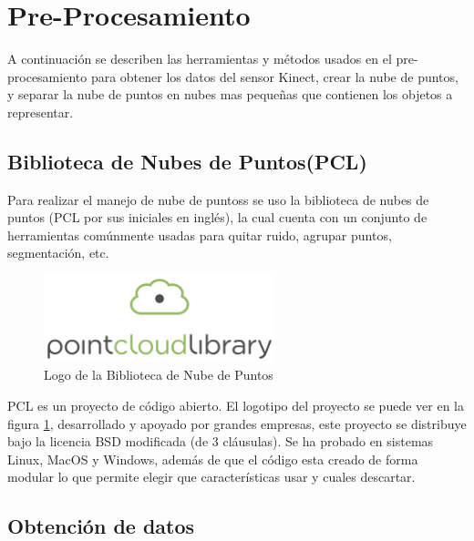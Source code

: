 \section{Pre-Procesamiento}

    A continuación se describen las herramientas y métodos usados en el pre-procesamiento para obtener los datos del sensor Kinect, crear la nube de puntos,  y separar la nube de puntos en nubes mas pequeñas que contienen los objetos a representar.
   
    
    \subsection{Biblioteca de Nubes de Puntos(PCL)}
    
    	
        Para realizar el manejo de \glspl{nube de puntos} se uso la biblioteca de nubes de puntos (PCL por sus iniciales en inglés)\cite{Rusu_ICRA2011_PCL}, la cual cuenta con un conjunto de herramientas comúnmente usadas para quitar ruido, agrupar puntos, segmentación, etc.\\
        
        \begin{figure}[!htb] 
            \centering
            \includegraphics[width=0.6\textwidth]{02Desarrollo/Preprocesamiento/imagenes/pointcloudlibrary_vert_large_pos.png}
            \caption{Logo de la Biblioteca de Nube de Puntos} 
            \label{fig:PCL}
        \end{figure}
        
        PCL es un proyecto de código abierto. El logotipo del proyecto se puede ver en la figura \ref{fig:PCL}, desarrollado y apoyado por grandes empresas, este proyecto se distribuye bajo la licencia BSD modificada (de 3 cláusulas). Se ha probado en sistemas Linux, MacOS y Windows, además de que el código esta creado de forma modular lo que permite elegir que características usar y cuales descartar.\\
        
        
    \subsection{Obtención de datos}
    

